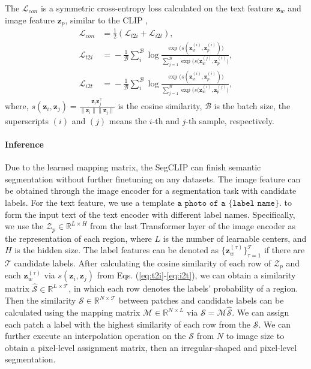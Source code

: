 \documentclass{article}
\theoremstyle{plain}
\theoremstyle{definition}
\theoremstyle{remark}
\begin{document}
The $\mathcal{L}_{con}$ is a symmetric cross-entropy loss calculated on the text feature $\mathbf{z}_w$ and image feature $\mathbf{z}_p$, similar to the CLIP \cite{Radford2021Learning},
\begin{align}
    \mathcal{L}_{con} &= \frac{1}{2} (\mathcal{L}_{t2i} + \mathcal{L}_{i2t}), \\
    \mathcal{L}_{t2i} &= \!\! -\frac{1}{\mathcal{B}} \!\! \sum_i^{\mathcal{B}} \! {\log \frac{\exp \big(s(\mathbf{z}_w^{(i)}, \mathbf{z}_p^{(i)}) \big)}{\sum_{j=1}^{\mathcal{B}}{\exp \big(s(\mathbf{z}_w^{(j)}, \mathbf{z}_p^{(i)} \big)}}}, \label{eq:t2i} \\
    \mathcal{L}_{i2t} &= \!\! -\frac{1}{\mathcal{B}} \!\! \sum_i^{\mathcal{B}} \! {\log \frac{\exp \big(s(\mathbf{z}_w^{(i)}, \mathbf{z}_p^{(i)}) \big)}{\sum_{j=1}^{\mathcal{B}}{\exp \big(s(\mathbf{z}_w^{(i)}, \mathbf{z}_p^{(j)} \big)}}}, \label{eq:i2t}
\end{align}
where, $s(\mathbf{z}_i, \mathbf{z}_j) = \frac{\mathbf{z}_i \mathbf{z}_j^\top}{\lVert \mathbf{z}_i \rVert \lVert \mathbf{z}_j \rVert}$ is the cosine similarity, $\mathcal{B}$ is the batch size, the superscripts $(i)$ and $(j)$ means the $i$-th and $j$-th sample, respectively.

\paragraph{Inference} Due to the learned mapping matrix, the SegCLIP can finish semantic segmentation without further finetuning on any datasets. The image feature can be obtained through the image encoder for a segmentation task with candidate labels. For the text feature, we use a template $\texttt{a photo of a \{label name\}.}$ to form the input text of the text encoder with different label names. Specifically, we use the $\mathcal{Z}_p \in \mathbb{R}^{L \times H}$ from the last Transformer layer of the image encoder as the representation of each region, where $L$ is the number of learnable centers, and $H$ is the hidden size. The label features can be denoted as $\{\mathbf{z}_w^{(\tau)}\}_{\tau=1}^{\mathcal{T}}$ if there are $\mathcal{T}$ candidate labels. After calculating the cosine similarity of each row of $\mathcal{Z}_p$ and each $\mathbf{z}_w^{(\tau)}$ via $s(\mathbf{z}_i, \mathbf{z}_j)$ from Eqs. (\ref{eq:t2i}-\ref{eq:i2t}), we can obtain a similarity matrix $\hat{\mathcal{S}} \in \mathbb{R}^{L \times \mathcal{T}}$, in which each row denotes the labels' probability of a region. Then the similarity $\mathcal{S} \in \mathbb{R}^{N \times \mathcal{T}}$ between patches and candidate labels can be calculated using the mapping matrix $\mathcal{M} \in \mathbb{R}^{N \times L}$ via $\mathcal{S} = \mathcal{M}\hat{\mathcal{S}}$. We can assign each patch a label with the highest similarity of each row from the $\mathcal{S}$. We can further execute an interpolation operation on the $\mathcal{S}$ from $N$ to image size to obtain a pixel-level assignment matrix, then an irregular-shaped and pixel-level segmentation.
\end{document}
